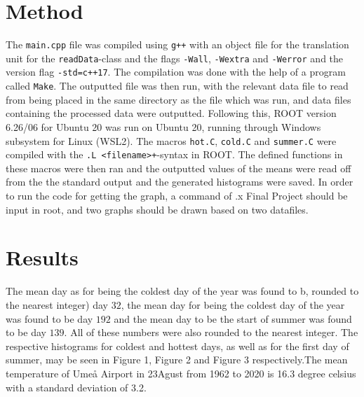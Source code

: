 \documentclass[a4, 12pt]{article}
\begin{document}
\section{Method}
The \texttt{main.cpp} file was compiled using \texttt{g++} with an object file for the translation unit for the \texttt{readData}-class and the flags \texttt{-Wall}, \texttt{-Wextra} and \texttt{-Werror} and the version flag \texttt{-std=c++17}. The compilation was done with the help of a program called \texttt{Make}. The outputted file was then run, with the relevant data file to read from being placed in the same directory as the file which was run, and data files containing the processed data were outputted. Following this, ROOT version 6.26/06 for Ubuntu 20 was run on Ubuntu 20, running through Windows subsystem for Linux (WSL2). The macros \texttt{hot.C}, \texttt{cold.C} and \texttt{summer.C} were compiled with the \texttt{.L <filename>+}-syntax in ROOT. The defined functions in these macros were then ran and the outputted values of the means were read off from the the standard output and the generated histograms were saved. In order to run the code for getting the graph, a command of .x Final Project should be input in root, and two graphs should be drawn based on two datafiles.




\section{Results}
The mean day as for being the coldest day of the year was found to b, rounded to the nearest integer) day $32$, the mean day for being the coldest day of the year was found to be day $192$ and the mean day to be the start of summer was found to be day $139$. All of these numbers were also rounded to the nearest integer. The respective histograms for coldest and hottest days, as well as for the first day of summer, may be seen in Figure 1, Figure 2 and Figure 3 respectively.The mean temperature of Umeå Airport in 23Agust from 1962 to 2020 is 16.3 degree celsius with a standard deviation of 3.2.

\end{document}
